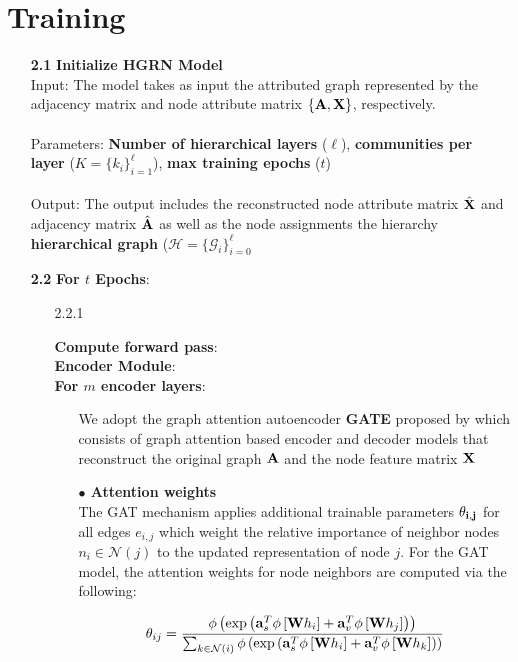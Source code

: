 \documentclass[a4paper,12pt]{article}
\newcommand{\forceindent}{\leavevmode{\parindent=2em\indent}}
\begin{document}
	\section{Training}
	\begin{itemize}
	\item[\bf 2.1]{\textbf{Initialize HGRN Model} \\
		Input: The model takes as input the attributed graph represented by the adjacency matrix and node attribute matrix $\{{\bf A}, {\bf X}\}$, respectively. \\
		\\
		Parameters: \textbf{Number of hierarchical layers} ($\ell$), \textbf{communities per layer} ($K =\{k_i\}_{i=1}^\ell$), \textbf{max training epochs} ($t$) \\
		\\
		Output: The output includes the reconstructed node attribute matrix $\hat{\bf X}$ and adjacency matrix $\hat{\bf A}$ as well as the node assignments the hierarchy \textbf{hierarchical graph} ($\mathcal{H} = \{\mathcal{G}_i\}_{i = 0}^\ell$
	}

	\item[\bf 2.2]{\textbf{For $t$ Epochs}:}
		\begin{enumerate}
			\item[2.2.1]{\textbf{Compute forward pass}: \\
			
			 \forceindent \textbf{Encoder Module}: \\
			 \forceindent \textbf{For $m$ encoder layers}: 
			\begin{enumerate}
				\item[]{We adopt the graph attention autoencoder \textbf{GATE} proposed by \cite{salehi2019graph} which consists of graph attention based encoder and decoder models that reconstruct the original graph ${\bf A}$ and the node feature matrix $\bf{X}$}
				\item[]{\textbf{$\bullet$ Attention weights} \\
					The GAT mechanism applies additional trainable parameters ${\bf \theta_{i,j}}$ for all edges ${e_{i,j}}$ which weight the relative importance of neighbor nodes $n_i \in \mathcal{N}(j)$ to the updated representation of node $j$. For the GAT model, the attention weights for node neighbors are computed via the following:
					
					\[ \theta_{ij} = \frac{\phi\left(\exp\left({\bf a}_s^T\phi\left[{\bf W}h_i\right]+{\bf a}_v^T\phi\left[{\bf W}h_j \right]\right)\right)}
					{\sum_{k\in \mathcal{N}(i)}\phi\left(\exp\left({\bf a}_s^T\phi\left[{\bf W}h_i\right]+{\bf a}_v^T\phi\left[{\bf W}h_k \right]\right)\right)} \]
					
}
\end{enumerate}}
\end{enumerate}
\end{itemize}
\end{document}
